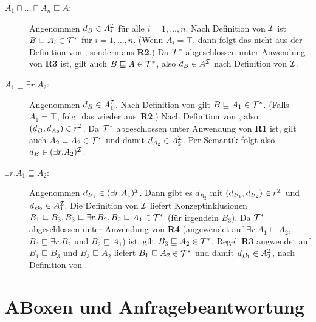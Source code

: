 \documentclass[fontsize=11pt, twoside=false, numbers=autoenddot]{scrbook}
\begin{document}
\begin{description}
  \item[{\boldmath $A_1\sqcap\ldots\sqcap A_n\sqsubseteq A$}:] 
    Angenommen
    $d_B\in A_i^\mathcal{I}$ für alle $i=1,\ldots,n$. Nach Definition von
    $\mathcal{I}$ ist $B\sqsubseteq A_i\in \mathcal{T}^*$ für $i=1,\ldots,n$. (Wenn
    $A_i=\top$, dann folgt das nicht aus der Definition von \Imc, sondern
    aus \textbf{\textsf{R2}}.) Da $\mathcal{T}^*$ abgeschlossen unter Anwendung
    von \textbf{\textsf{R3}} ist, gilt auch $B\sqsubseteq A\in \mathcal{T}^*$,
    also $d_B\in A^\mathcal{I}$ nach Definition von $\mathcal{I}$.
  \item[{\boldmath $A_1\sqsubseteq \exists r.A_2$}:] 
    Angenommen $d_B\in A_1^\mathcal{I}$.
    Nach Definition von \Imc gilt $B\sqsubseteq A_1\in \mathcal{T}^*$. (Falls
    $A_1=\top$, folgt das wieder aus~\textbf{\textsf{R2}}.) Nach
    Definition von \Imc, also $(d_B,d_{A_2})\in r^\mathcal{I}$. 
    Da $\mathcal{T}^*$ abgeschlossen unter Anwendung
    von \textbf{\textsf{R1}} ist, gilt auch $A_2\sqsubseteq A_2\in
    \mathcal{T}^*$ und damit $d_{A_2}\in A_2^\mathcal{I}$. Per Semantik folgt also $d_B\in (\exists r.A_2)^\mathcal{I}$.
  \item[{\boldmath $\exists r.A_1\sqsubseteq A_2$}:] 
    Angenommen $d_{B_1}\in (\exists r.A_1)^\mathcal{I}$. Dann gibt es $d_{B_2}$
    mit $(d_{B_1},d_{B_2})\in r^\mathcal{I}$ und $d_{B_2}\in A_1^\mathcal{I}$. Die
    Definition von $\mathcal{I}$ liefert Konzeptinklusionen $B_1\sqsubseteq B_3,
    B_3\sqsubseteq \exists r.B_2, B_2\sqsubseteq A_1\in \mathcal{T}^*$ (für
    irgendein $B_3$). Da $\mathcal{T}^*$ abgeschlossen unter Anwendung
    von \textbf{\textsf{R4}} (angewendet auf $\exists r.A_1\sqsubseteq
    A_2$, $B_3\sqsubseteq \exists r.B_2$ und $B_2\sqsubseteq A_1$) ist,
    gilt $B_3\sqsubseteq A_2\in \mathcal{T}^*$. Regel~\textbf{\textsf{R3}}
    angwendet auf $B_1\sqsubseteq B_3$ und $B_3\sqsubseteq A_2$ liefert
    $B_1\sqsubseteq A_2\in \mathcal{T}^*$ und damit $d_{B_1}\in A_2^\mathcal{I}$, nach
    Definition von \Imc.
    \qedhere
\end{description}


\part{ABoxen und Anfragebeantwortung}


%

\pagebreak
{}


\end{document}
